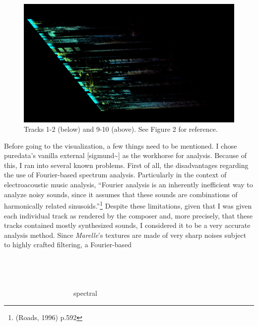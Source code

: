 \documentclass{article}
\begin{document}
\begin{figure}
\begin{multicols}{2}
    \includegraphics[width=\linewidth]{preset-50-2.jpg}%
\end{multicols}
\caption{Tracks 1-2 (below) and 9-10 (above). See Figure 2 for reference.}
\end{figure}




\newpage

Before going to the visualization, a few things need to be mentioned. I chose puredata's vanilla external [sigmund\~{}] as the workhorse for analysis. Because of this, I ran into several known problems. First of all, the disadvantages regarding the use of Fourier-based spectrum analysis. Particularly in the context of electroacoustic music analysis, ``Fourier analysis is an inherently inefficient way to analyze noisy sounds, since it assumes that these sounds are combinations of harmonically related sinusoids.''\footnote{(Roads, 1996) p.592} Despite these limitations, given that I was given each individual track as rendered by the composer and, more precisely, that these tracks contained mostly synthesized sounds, I considered it to be a very accurate analysis method. Since \textit{Marelle}'s textures are made of very sharp noises subject to highly crafted filtering, a Fourier-based \ \ \ \ \ \ \ \ \ \ \ \ \ \ \ \ \ \ \ \ \ \ \ \ \ \ \ \ \ \ \ \ \ \ \ \ \ \ \ \ \ \ \ \ \ \ \ \ \ \ \ \ \ \ \ \ \ \ \ \ \ \ \ \ \ \ \ \ \ \ \ \ \ \ \ \ \ \ \ \ \ \ \ \ \ \ \ \ \ \ \ \ \ \ \ \ \ \ \ \ \ \ \ \ \ \ \ \ \ \ \ \ \ \ \ \ \ \ \ \ \ \ \ \ \ \ \ \ \ \ \ \ \ \ \ \ \ \ \ \ \ \ \ \ \ \ \ \ \ \ \ \ \ \ \ \ \ \ \ \ \ \ \ \ \ \ \ \ \ \ \ \ \ \ \ \ \ \ \ \ \ \ \ \ \ \ \ \ \ \ \ \ \ \ \ \ \ \ \ \ \ \ \ \ \ \ \ \ \ \ \ \ \ \ \ \ \ \ \ \ \ \ \ \ \ \ \ \ \ \ \ \ \ \ \ \ \ \ \ \ \ \ \ \ \ \ \ \ \ \ \ \ \ \ \ \ \ \ \ \ \ \ \ \ \ \ \ \ \ \ \ \ \ \ \ \ \ \ \ \ \ \ \ \ \ \ \ \ \ \ \ \ \ \ \ \ \ \ \ \ \ \ \ \ \ \ \ \ spectral
\end{document}
